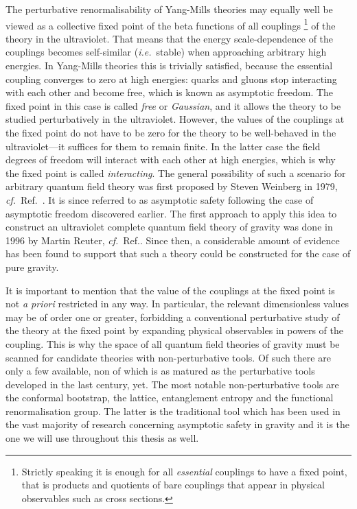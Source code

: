 \documentclass[11pt]{book}
\newcommand\apriori{\textit{a priori} }
\newcommand\ie{\textit{i.e.}\ }
\newcommand\cf{\textit{cf.}\ }
\numberwithin{equation}{chapter}
\begin{document}
The perturbative renormalisability of Yang-Mills theories may
equally well be viewed as
a collective fixed point of the beta functions of all couplings%
\footnote{%
  Strictly speaking it is enough for all \textit{essential} couplings
  to have a fixed point, that is products and quotients of bare couplings
  that appear in physical observables such as cross sections.
}
of the theory in the ultraviolet. That means that the energy scale-dependence
of the couplings becomes self-similar (\ie stable) when approaching arbitrary
high energies. In Yang-Mills theories this is trivially satisfied, because
the essential coupling converges to zero at high energies: quarks and gluons stop interacting
with each other and become free, which is known as asymptotic freedom. The fixed
point in this case is called \textit{free} or \textit{Gaussian}, and it allows
the theory to be studied perturbatively in the ultraviolet. However, the values
of the couplings at the fixed point do not have to be zero for the theory to
be well-behaved in the ultraviolet---it suffices for them to remain finite.
In the latter case the field degrees of freedom will interact with each other at
high energies, which is why the fixed point is called \textit{interacting}.
The general possibility of such a scenario for arbitrary quantum field theory
was first proposed by Steven Weinberg in 1979, \cf Ref.~\cite{Weinberg:1980gg}.
It is since referred to as asymptotic safety following the case of asymptotic
freedom discovered earlier.
The first approach to apply this idea to construct an ultraviolet complete quantum
field theory of gravity was done in 1996 by Martin Reuter, \cf Ref.\cite{Reuter:1996cp}.
Since then, a considerable amount of evidence has been found to support that such
a theory could be constructed for the case of pure gravity.

It is important to mention that the value of the couplings at the fixed point is not
\apriori restricted in any way. In particular, the relevant dimensionless values
may be of order one or greater, forbidding a conventional perturbative study of the theory
at the fixed point by expanding physical observables in powers of the coupling.
This is why the space of all quantum field theories of gravity must be scanned for
candidate theories with non-perturbative tools. Of such there are only a few available,
non of which is as matured as the perturbative tools developed in the last century, yet.
The most notable non-perturbative tools are the conformal bootstrap,
the lattice, entanglement entropy and the functional renormalisation group.
The latter is the traditional tool which has been used in the vast majority
of research concerning asymptotic safety in gravity and it is the one we will use
throughout this thesis as well.
\end{document}
